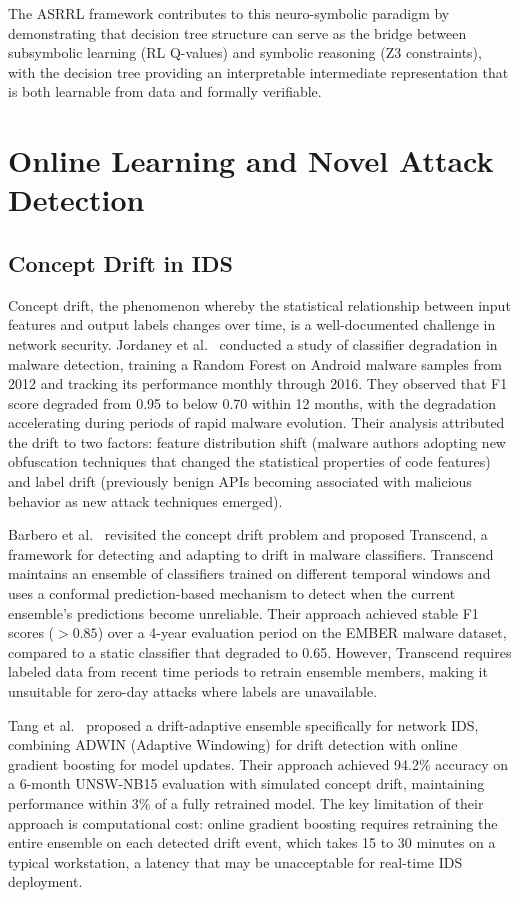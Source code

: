 \documentclass[12pt, letterpaper, oneside]{report}
\newcommand{\ASRRL}{\textsc{ASRRL}}
\begin{document}
The \ASRRL{} framework contributes to this neuro-symbolic paradigm by demonstrating that decision tree structure can serve as the bridge between subsymbolic learning (RL Q-values) and symbolic reasoning (Z3 constraints), with the decision tree providing an interpretable intermediate representation that is both learnable from data and formally verifiable.


\section{Online Learning and Novel Attack Detection}
\label{sec:lit_online}

\subsection{Concept Drift in IDS}

Concept drift, the phenomenon whereby the statistical relationship between input features and output labels changes over time, is a well-documented challenge in network security. Jordaney et al.~\citep{jordaney2017} conducted a study of classifier degradation in malware detection, training a Random Forest on Android malware samples from 2012 and tracking its performance monthly through 2016. They observed that F1 score degraded from 0.95 to below 0.70 within 12 months, with the degradation accelerating during periods of rapid malware evolution. Their analysis attributed the drift to two factors: feature distribution shift (malware authors adopting new obfuscation techniques that changed the statistical properties of code features) and label drift (previously benign APIs becoming associated with malicious behavior as new attack techniques emerged).

Barbero et al.~\citep{barbero2022} revisited the concept drift problem and proposed Transcend, a framework for detecting and adapting to drift in malware classifiers. Transcend maintains an ensemble of classifiers trained on different temporal windows and uses a conformal prediction-based mechanism to detect when the current ensemble's predictions become unreliable. Their approach achieved stable F1 scores ($> 0.85$) over a 4-year evaluation period on the EMBER malware dataset, compared to a static classifier that degraded to 0.65. However, Transcend requires labeled data from recent time periods to retrain ensemble members, making it unsuitable for zero-day attacks where labels are unavailable.

Tang et al.~\citep{tang2020} proposed a drift-adaptive ensemble specifically for network IDS, combining ADWIN (Adaptive Windowing) for drift detection with online gradient boosting for model updates. Their approach achieved 94.2\% accuracy on a 6-month UNSW-NB15 evaluation with simulated concept drift, maintaining performance within 3\% of a fully retrained model. The key limitation of their approach is computational cost: online gradient boosting requires retraining the entire ensemble on each detected drift event, which takes 15 to 30 minutes on a typical workstation, a latency that may be unacceptable for real-time IDS deployment.
\end{document}
